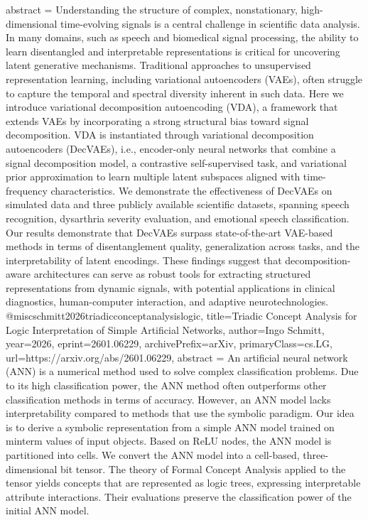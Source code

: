 {      abstract = {Understanding the structure of complex, nonstationary, high-dimensional time-evolving signals is a central challenge in scientific data analysis. In many domains, such as speech and biomedical signal processing, the ability to learn disentangled and interpretable representations is critical for uncovering latent generative mechanisms. Traditional approaches to unsupervised representation learning, including variational autoencoders (VAEs), often struggle to capture the temporal and spectral diversity inherent in such data. Here we introduce variational decomposition autoencoding (VDA), a framework that extends VAEs by incorporating a strong structural bias toward signal decomposition. VDA is instantiated through variational decomposition autoencoders (DecVAEs), i.e., encoder-only neural networks that combine a signal decomposition model, a contrastive self-supervised task, and variational prior approximation to learn multiple latent subspaces aligned with time-frequency characteristics. We demonstrate the effectiveness of DecVAEs on simulated data and three publicly available scientific datasets, spanning speech recognition, dysarthria severity evaluation, and emotional speech classification. Our results demonstrate that DecVAEs surpass state-of-the-art VAE-based methods in terms of disentanglement quality, generalization across tasks, and the interpretability of latent encodings. These findings suggest that decomposition-aware architectures can serve as robust tools for extracting structured representations from dynamic signals, with potential applications in clinical diagnostics, human-computer interaction, and adaptive neurotechnologies.}
}@misc{schmitt2026triadicconceptanalysislogic,
      title={Triadic Concept Analysis for Logic Interpretation of Simple Artificial Networks}, 
      author={Ingo Schmitt},
      year={2026},
      eprint={2601.06229},
      archivePrefix={arXiv},
      primaryClass={cs.LG},
      url={https://arxiv.org/abs/2601.06229},
      abstract = {An artificial neural network (ANN) is a numerical method used to solve complex classification problems. Due to its high classification power, the ANN method often outperforms other classification methods in terms of accuracy. However, an ANN model lacks interpretability compared to methods that use the symbolic paradigm. Our idea is to derive a symbolic representation from a simple ANN model trained on minterm values of input objects. Based on ReLU nodes, the ANN model is partitioned into cells. We convert the ANN model into a cell-based, three-dimensional bit tensor. The theory of Formal Concept Analysis applied to the tensor yields concepts that are represented as logic trees, expressing interpretable attribute interactions. Their evaluations preserve the classification power of the initial ANN model.}
}
